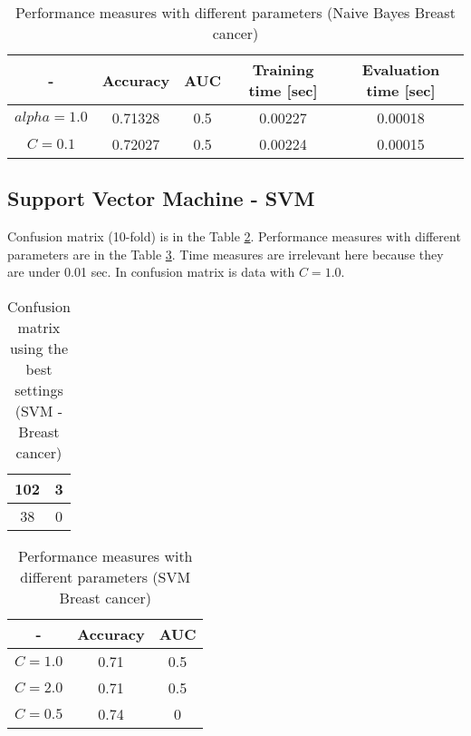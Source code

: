 \documentclass[11pt,a4paper,titlepage]{article}
\begin{document}
  \begin{table}
  \centering
 \begin{tabular}{| c | c | c | c | c |}
    \hline
     		-	   & Accuracy & AUC &Training time [sec] & Evaluation time [sec] \\ \hline
    $alpha = 1.0$ &  0.71328 &	  0.5		& 	0.00227		  & 		0.00018 		\\ \hline
    $C = 0.1$ & 	0.72027	 &	0.5	& 		0.00224			  &			0.00015		\\ \hline
  \end{tabular}
  \caption{Performance measures with different parameters (Naive Bayes Breast cancer)}
  \label{table:NaiveByescancer}
  \end{table}


\subsection{Support Vector Machine - SVM}

Confusion matrix (10-fold) is in the Table \ref{table:confusionMatrixSVMcancer}. Performance measures with different parameters are in the Table \ref{table:SVMcancer}. Time measures are irrelevant here because they are under 0.01 sec. In confusion matrix is data with $C = 1.0$. 
\begin{table}
  \centering
  \begin{tabular}{| c | c |}
    \hline
   	   102   & 3 \\ \hline
         38 &  0 \\
    \hline
  \end{tabular}
  \caption{Confusion matrix using the best settings (SVM - Breast cancer)}
  \label{table:confusionMatrixSVMcancer}
  \end{table}
  
  \begin{table}
  \centering
  \begin{tabular}{| c | c | c |}
    \hline
     		-	   & Accuracy & 	AUC  \\ \hline
    $C = 1.0$ &  0.71	  	&     0.5	 		\\ \hline
    $C = 2.0$ & 	0.71	  & 	0.5 			\\ \hline
    $C = 0.5$ & 		  0.74		& 		0			\\ 
    \hline
  \end{tabular}
  \caption{Performance measures with different parameters (SVM Breast cancer)}
  \label{table:SVMcancer}
  \end{table}
  
\end{document}
